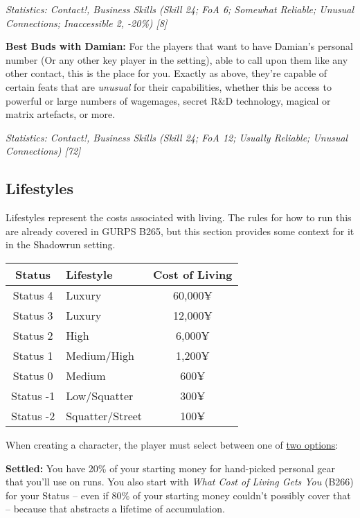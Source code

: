\begin{multicols*}{2}
	\textit{\textcolor{OliveGreen}{Statistics: Contact!, Business Skills (Skill 24; FoA 6; Somewhat Reliable; Unusual Connections; Inaccessible 2, -20\%) [8]}}
	
	\textbf{Best Buds with Damian:} For the players that want to have Damian's personal number (Or any other key player in the setting), able to call upon them like any other contact, this is the place for you. Exactly as above, they're capable of certain feats that are \textit{unusual} for their capabilities, whether this be access to powerful or large numbers of wagemages, secret R\&D technology, magical or matrix artefacts, or more.
	
	\textit{\textcolor{OliveGreen}{Statistics: Contact!, Business Skills (Skill 24; FoA 12; Usually Reliable; Unusual Connections) [72]}}
	
	\subsection{Lifestyles}
	
	Lifestyles represent the costs associated with living. The rules for how to run this are already covered in GURPS B265, but this section provides some context for it in the Shadowrun setting.
	
	\begin{center}
		\begin{tabularx}{0.49\textwidth}{|c|X|c|}
			\hline
			Status & Lifestyle & Cost of Living \\
			\hline
			\hline
			Status 4 & Luxury & 60,000¥ \\
			Status 3 & Luxury & 12,000¥ \\
			Status 2 & High & 6,000¥ \\
			Status 1 & Medium/High & 1,200¥ \\
			Status 0 & Medium & 600¥ \\
			Status -1 & Low/Squatter & 300¥ \\
			Status -2 & Squatter/Street & 100¥ \\
			\hline
		\end{tabularx}
	\end{center}
	
	When creating a character, the player must select between one of \textcolor{Blue}{\href{http://forums.sjgames.com/showpost.php?p=1792209&postcount=7}{two options}}:
	
	\textbf{Settled:} You have 20\% of your starting money for hand-picked personal gear that you'll use on runs. You also start with \textit{What Cost of Living Gets You} (B266) for your Status – even if 80\% of your starting money couldn't possibly cover that – because that abstracts a lifetime of accumulation.
	

\end{multicols*}
